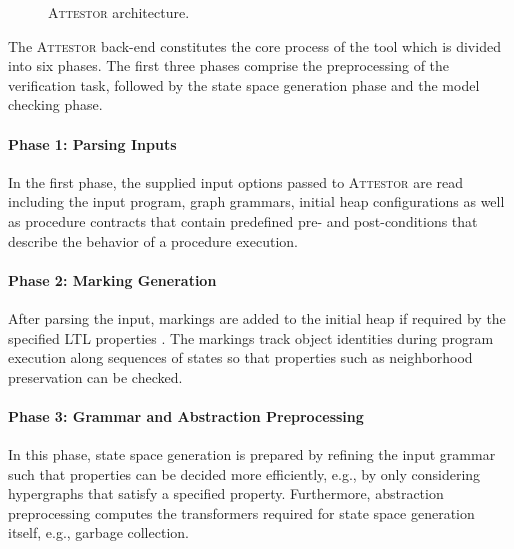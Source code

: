 \documentclass[a4paper, 12pt, twoside]{report}
\begin{document}
\begin{figure}[!h]
\begin{center}
{}
			\caption{\textsc{Attestor} architecture. \cite{arndt2018let}}\label{fig:attestor}
		\end{center}
	\end{figure}
	
	The \textsc{Attestor} back-end constitutes the core process of the tool which is divided into six phases. The first three phases comprise the preprocessing of the verification task, followed by the state space generation phase and the model checking phase.
	
	\paragraph{Phase 1: Parsing Inputs}
	In the first phase, the supplied input options passed to \textsc{Attestor} are read including the input program, graph grammars, initial heap configurations as well as procedure contracts that contain predefined pre- and post-conditions that describe the behavior of a procedure execution.
	
	\paragraph{Phase 2: Marking Generation} 
	After parsing the input, markings are added to the initial heap if required by the specified LTL properties \cite{heinen2015verifyingPhd}. The markings track object identities during program execution along sequences of states so that properties such as neighborhood preservation can be checked.\\
	
	\paragraph{Phase 3: Grammar and Abstraction Preprocessing}
	In this phase, state space generation is prepared by refining the input grammar such that properties can be decided more efficiently, e.g., by only considering hypergraphs that satisfy a specified property. Furthermore, abstraction preprocessing computes the transformers required for state space generation itself, e.g., garbage collection. 
	
\end{document}

